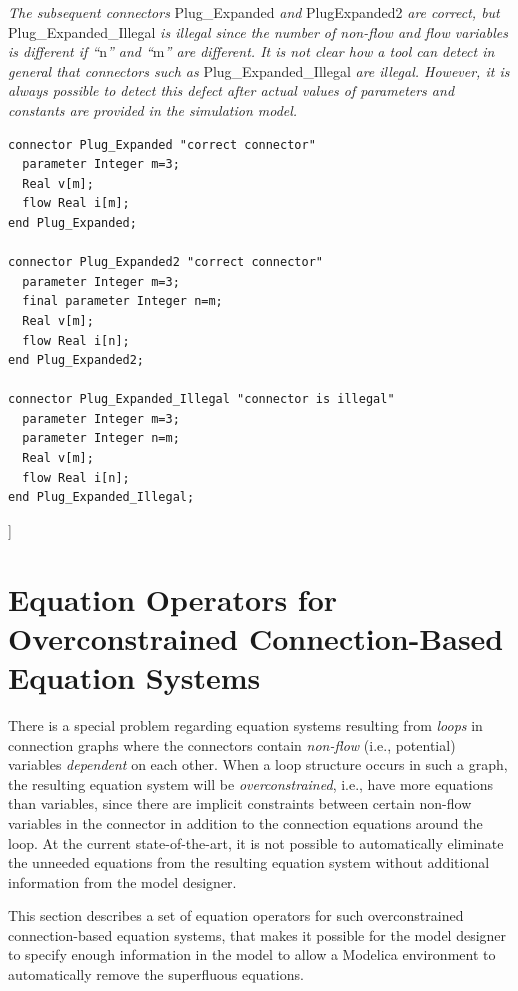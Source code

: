 \documentclass[10pt,a4paper]{report}
\def\doublelabel#1{\label{#1}\hypertarget{#1}{}}
\begin{document}
\emph{The subsequent connectors} Plug\_Expanded \emph{and} PlugExpanded2
\emph{are correct, but} Plug\_Expanded\_Illegal \emph{is illegal since
the number of non-flow and flow variables is different if ``}n\emph{''
and ``}m\emph{'' are different. It is not clear how a tool can detect in
general that connectors such as} Plug\_Expanded\_Illegal \emph{are
illegal. However, it is always possible to detect this defect after
actual values of parameters and constants are provided in the simulation
model.}

\begin{lstlisting}[language=modelica]
connector Plug_Expanded "correct connector"
  parameter Integer m=3;
  Real v[m];
  flow Real i[m];
end Plug_Expanded;

connector Plug_Expanded2 "correct connector"
  parameter Integer m=3;
  final parameter Integer n=m;
  Real v[m];
  flow Real i[n];
end Plug_Expanded2;

connector Plug_Expanded_Illegal "connector is illegal"
  parameter Integer m=3;
  parameter Integer n=m;
  Real v[m];
  flow Real i[n];
end Plug_Expanded_Illegal;
\end{lstlisting}

{]}

\section{Equation Operators for Overconstrained Connection-Based Equation Systems}\doublelabel{equation-operators-for-overconstrained-connection-based-equation-systems1}

There is a special problem regarding equation systems resulting from
\emph{loops} in connection graphs where the connectors contain
\emph{non-flow} (i.e., potential) variables \emph{dependent} on each
other. When a loop structure occurs in such a graph, the resulting
equation system will be \emph{overconstrained}, i.e., have more
equations than variables, since there are implicit constraints between
certain non-flow variables in the connector in addition to the
connection equations around the loop. At the current state-of-the-art,
it is not possible to automatically eliminate the unneeded equations
from the resulting equation system without additional information from
the model designer.

This section describes a set of equation operators for such
overconstrained connection-based equation systems, that makes it
possible for the model designer to specify enough information in the
model to allow a Modelica environment to automatically remove the
superfluous equations.
\end{document}
